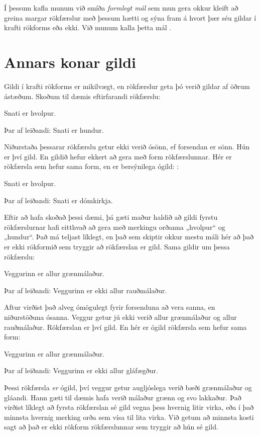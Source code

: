 Í þessum kafla munum við smíða \emph{formlegt mál} sem mun gera okkur kleift að greina margar rökfærslur með þessum hætti og sýna fram á hvort þær séu gildar í krafti rökforms eða ekki. Við munum kalla þetta mál . 

\section{Annars konar gildi}
Gildi í krafti rökforms er mikilvægt, en rökfærslur geta þó verið gildar af öðrum ástæðum. Skoðum til dæmis eftirfarandi rökfærslu:

	\begin{earg}
		\item[] Snati er hvolpur. 
		\item[Þar af leiðandi:] Snati er hundur.
	\end{earg}
Niðurstaða þessarar rökfærslu getur ekki verið ósönn, ef forsendan er sönn. Hún er því gild. En gildið hefur ekkert að gera með form rökfærslunnar. Hér er rökfærsla sem hefur sama form, en er bersýnilega ógild:	
	:
	\begin{earg}
		\item[] Snati er hvolpur.
		\item[Þar af leiðandi:] Snati er dómkirkja.
	\end{earg}
Eftir að hafa skoðað þessi dæmi, þá gæti maður haldið að gildi fyrstu rökfærslurnar hafi eitthvað að gera með merkingu orðanna „hvolpur“ og „hundur“. Það má teljast líklegt, en það sem skiptir okkur mestu máli hér að það er ekki rökformið sem tryggir að rökfærslan er gild. Sama gildir um þessa rökfærslu:
	\begin{earg}
		\item[] Veggurinn er allur grænmálaður.
		\item[Þar af leiðandi:] Veggurinn er ekki allur rauðmálaður. 
	\end{earg}
Aftur virðist það alveg ómögulegt fyrir forsenduna að vera sanna, en niðurstöðuna ósanna. Veggur getur jú ekki verið allur grænmálaður og allur rauðmálaður. Rökfærslan er því gild. En hér er ógild rökfærsla sem hefur sama form:
	\begin{earg}
		\item[] Veggurinn er allur grænmálaður.
		\item[Þar af leiðandi:] Veggurinn er ekki allur gláfægður.
	\end{earg}
Þessi rökfærsla \emph{er} ógild, því veggur getur augljóslega verið bæði grænmálaður og gláandi. Hann gæti til dæmis hafa verið málaður grænn og svo lakkaður. Það virðist líklegt að fyrsta rökfærslan sé gild vegna þess hvernig litir virka, eða í það minnsta hvernig merking orða sem vísa til lita virka. Við getum að minnsta kosti sagt að það er ekki rökform rökfærslunnar sem tryggir að hún sé gild.	
	

